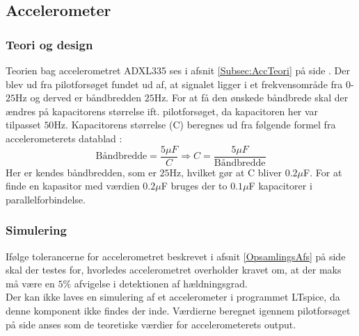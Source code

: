 \subsection{Accelerometer}
\subsubsection{Teori og design}
Teorien bag accelerometret ADXL335 ses i afsnit \ref{Subsec:AccTeori} på side \pageref{Subsec:AccTeori}. Der blev ud fra pilotforsøget fundet ud af, at signalet ligger i et frekvensområde fra $0$-$25$Hz og derved er båndbredden $25$Hz. For at få den ønskede båndbrede skal der ændres på kapacitorens størrelse ift. pilotforsøget, da kapacitoren her var tilpasset $50$Hz. Kapacitorens størrelse (C) beregnes ud fra følgende formel fra accelerometerets datablad \cite{Devices2009}:
\begin{equation}
\text{Båndbredde} = \dfrac{5\mu F}{C} \Rightarrow  C = \dfrac{5\mu F}{\text{Båndbredde}}
\end{equation}
Her er kendes båndbredden, som er $25$Hz, hvilket gør at C bliver $0.2\mu$F. For at finde en kapasitor med værdien $0.2\mu$F bruges der to $0.1\mu$F kapacitorer i parallelforbindelse.  

\subsubsection{Simulering}
Ifølge tolerancerne for accelerometret beskrevet i afsnit \ref{OpsamlingsAfs} på side \pageref{OpsamlingsAfs} skal der testes for, hvorledes accelerometret overholder kravet om, at der maks må være en $5\%$ afvigelse i detektionen af hældningsgrad. \\
Der kan ikke laves en simulering af et accelerometer i programmet LTspice, da denne komponent ikke findes der inde. Værdierne beregnet igennem pilotforsøget på side \pageref{Bilag:Pilotforsoeg} anses som de teoretiske værdier for accelerometerets output.

